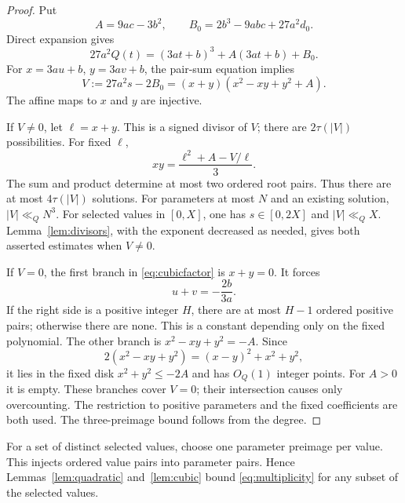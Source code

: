 \documentclass[11pt]{article}
\theoremstyle{definition}
\theoremstyle{remark}
\numberwithin{equation}{section}
\begin{document}
\begin{proof}
Put
\begin{equation}\label{eq:cubicAB}
 A=9ac-3b^2,\qquad B_0=2b^3-9abc+27a^2d_0.
\end{equation}
Direct expansion gives
\begin{equation}\label{eq:cubicidentity}
       27a^2Q(t)=(3at+b)^3+A(3at+b)+B_0.
\end{equation}
For $x=3au+b$, $y=3av+b$, the pair-sum equation implies
\begin{equation}\label{eq:cubicfactor}
 V:=27a^2s-2B_0=(x+y)(x^2-xy+y^2+A).
\end{equation}
The affine maps to $x$ and $y$ are injective.

If $V\ne0$, let $\ell=x+y$. This is a signed divisor of $V$;
there are $2\tau(|V|)$ possibilities. For fixed $\ell$,
\begin{equation}\label{eq:cubicproduct}
                 xy=\frac{\ell^2+A-V/\ell}{3}.
\end{equation}
The sum and product determine at most two ordered root pairs.
Thus there are at most $4\tau(|V|)$ solutions. For parameters at
most $N$ and an existing solution, $|V|\ll_QN^3$. For selected values
in $[0,X]$, one has $s\in[0,2X]$ and $|V|\ll_QX$.
Lemma~\ref{lem:divisors}, with the exponent decreased as needed,
gives both asserted estimates when $V\ne0$.

If $V=0$, the first branch in \eqref{eq:cubicfactor} is $x+y=0$.
It forces
\begin{equation}\label{eq:cubiclinearbranch}
                         u+v=-\frac{2b}{3a}.
\end{equation}
If the right side is a positive integer $H$, there are at most $H-1$
ordered positive pairs; otherwise there are none. This is a constant
depending only on the fixed polynomial. The other branch is
$x^2-xy+y^2=-A$. Since
\begin{equation}\label{eq:cubicpositiveform}
       2(x^2-xy+y^2)=(x-y)^2+x^2+y^2,
\end{equation}
it lies in the fixed disk $x^2+y^2\le-2A$ and has $O_Q(1)$ integer
points. For $A>0$ it is empty. These branches cover $V=0$;
their intersection causes only overcounting. The restriction to
positive parameters and the fixed coefficients are both used.
The three-preimage bound follows from the degree.
\end{proof}

For a set of distinct selected values, choose one parameter preimage
per value. This injects ordered value pairs into parameter pairs.
Hence Lemmas~\ref{lem:quadratic} and~\ref{lem:cubic} bound
\eqref{eq:multiplicity} for any subset of the selected values.
\end{document}
